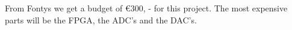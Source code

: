From Fontys we get a budget of €300, - for this project. The most expensive parts will be the FPGA, the ADC’s and the DAC’s.  